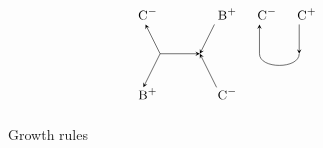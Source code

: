 \documentclass[nonatbib,numbers,10pt]{llncs}
\begin{document}
\begin{figure}[h!]
\[\begin{tikzpicture}
\node (i33) at (7,-5) {$\textsc{\small C}^-$};
\node (ii33) at (9,-5) {$\textsc{\small B}^+$};
\node (d33) at (7.5,-6) {};
\node (dd33) at (8.5,-6) {};
\node (o33) at (7,-7) {$\textsc{\small B}^+$};
\node (oo33) at (9,-7) {$\textsc{\small C}^-$};
\draw[<-,>=stealth] (i33) -- (d33.center);
\draw[->,>=stealth] (ii33) -- (dd33.center);
\draw[->,>=stealth] (d33.center) -- (dd33.center);
\draw[->,>=stealth, shorten >=5pt] (d33.center) -- (o33.center);
\draw[<-,>=stealth, shorten >=5pt] (dd33.center) -- (oo33.center);

\node (i34) at (10,-5) {$\textsc{\small C}^-$};
\node (ii34) at (11,-5) {$\textsc{\small C}^+$};
\node (d34) at (10,-6) {};
\node (dd34) at (11,-6) {};
\draw[<-,>=stealth] (i34) -- (d34.center);
\draw[->,>=stealth] (ii34) -- (dd34.center);
\draw (d34.center) edge [-,>=stealth,bend right=90] (dd34.center);

\end{tikzpicture}
\]
\caption{Growth rules}
\label{fig:rules}
\end{figure}
\end{document}
